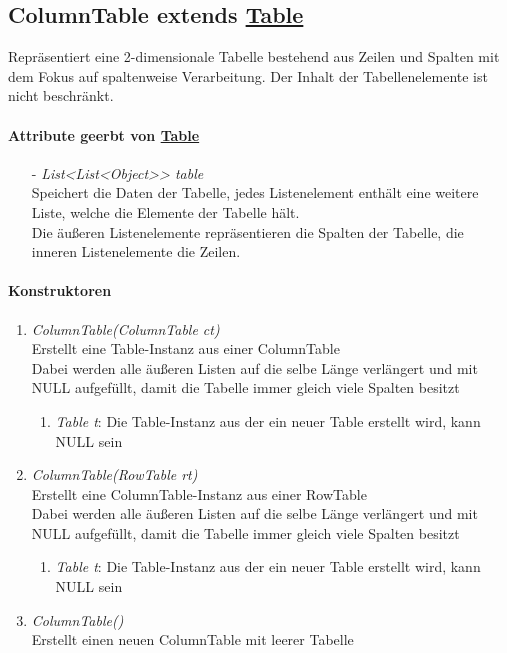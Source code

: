 \subsection{ColumnTable extends \hyperref[Table]{Table}}

Repräsentiert eine 2-dimensionale Tabelle bestehend aus Zeilen und Spalten mit dem Fokus auf spaltenweise Verarbeitung. Der Inhalt der Tabellenelemente ist nicht beschränkt.


\paragraph{Attribute geerbt von \hyperref[Table]{Table}}

\begin{itemize}
	\item[-] \textit{List{<List<Object>}> table} \\
	Speichert die Daten der Tabelle, jedes Listenelement enthält eine weitere Liste, welche die Elemente der Tabelle hält. \\
	Die äußeren Listenelemente repräsentieren die Spalten der Tabelle, die inneren Listenelemente die Zeilen.
\end{itemize}


\paragraph{Konstruktoren}

\begin{enumerate}[+]
	\item \textit{ColumnTable(ColumnTable ct)} \\
	Erstellt eine Table-Instanz aus einer ColumnTable \\
	Dabei werden alle äußeren Listen auf die selbe Länge verlängert und mit NULL aufgefüllt, damit die Tabelle immer gleich viele Spalten besitzt	
	\begin{enumerate}[$\bullet$]
		\item \textit{Table t}: Die Table-Instanz aus der ein neuer Table erstellt wird, kann NULL sein
	\end{enumerate}
	\vspace{-0.2cm}
	
	\item \textit{ColumnTable(RowTable rt)} \\
	Erstellt eine ColumnTable-Instanz aus einer RowTable \\
	Dabei werden alle äußeren Listen auf die selbe Länge verlängert und mit NULL aufgefüllt, damit die Tabelle immer gleich viele Spalten besitzt	
	\begin{enumerate}[$\bullet$]
		\item \textit{Table t}: Die Table-Instanz aus der ein neuer Table erstellt wird, kann NULL sein
	\end{enumerate}
	\vspace{-0.2cm}
	
	\item \textit{ColumnTable()} \\
	Erstellt einen neuen ColumnTable mit leerer Tabelle
\end{enumerate}

